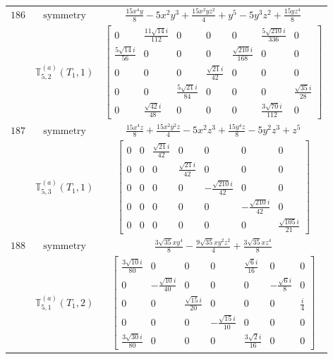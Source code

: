 \documentclass[fleqn,8pt,landscape]{jsarticle}
\begin{document}
\begin{longtable}{ccc}
$ 186 $ & $ \text{symmetry} $ & $ \frac{15 x^{4} y}{8} - 5 x^{2} y^{3} + \frac{15 x^{2} y z^{2}}{4} + y^{5} - 5 y^{3} z^{2} + \frac{15 y z^{4}}{8} $ \\
$  $ & $ \mathbb{T}_{5,2}^{(a)}(T_{1},1) $ & $ \begin{bmatrix} 0 & \frac{11 \sqrt{14} i}{112} & 0 & 0 & 0 & \frac{5 \sqrt{210} i}{336} & 0 \\ \frac{5 \sqrt{14} i}{56} & 0 & 0 & 0 & \frac{\sqrt{210} i}{168} & 0 & 0 \\ 0 & 0 & 0 & \frac{\sqrt{21} i}{42} & 0 & 0 & 0 \\ 0 & 0 & \frac{5 \sqrt{21} i}{84} & 0 & 0 & 0 & \frac{\sqrt{35} i}{28} \\ 0 & \frac{\sqrt{42} i}{48} & 0 & 0 & 0 & \frac{3 \sqrt{70} i}{112} & 0 \end{bmatrix} $ \\ \hline
$ 187 $ & $ \text{symmetry} $ & $ \frac{15 x^{4} z}{8} + \frac{15 x^{2} y^{2} z}{4} - 5 x^{2} z^{3} + \frac{15 y^{4} z}{8} - 5 y^{2} z^{3} + z^{5} $ \\
$  $ & $ \mathbb{T}_{5,3}^{(a)}(T_{1},1) $ & $ \begin{bmatrix} 0 & 0 & \frac{\sqrt{21} i}{42} & 0 & 0 & 0 & 0 \\ 0 & 0 & 0 & \frac{\sqrt{21} i}{42} & 0 & 0 & 0 \\ 0 & 0 & 0 & 0 & - \frac{\sqrt{210} i}{42} & 0 & 0 \\ 0 & 0 & 0 & 0 & 0 & - \frac{\sqrt{210} i}{42} & 0 \\ 0 & 0 & 0 & 0 & 0 & 0 & \frac{\sqrt{105} i}{21} \end{bmatrix} $ \\ \hline
$ 188 $ & $ \text{symmetry} $ & $ \frac{3 \sqrt{35} x y^{4}}{8} - \frac{9 \sqrt{35} x y^{2} z^{2}}{4} + \frac{3 \sqrt{35} x z^{4}}{8} $ \\
$  $ & $ \mathbb{T}_{5,1}^{(a)}(T_{1},2) $ & $ \begin{bmatrix} \frac{3 \sqrt{10} i}{80} & 0 & 0 & 0 & \frac{\sqrt{6} i}{16} & 0 & 0 \\ 0 & - \frac{\sqrt{10} i}{40} & 0 & 0 & 0 & - \frac{\sqrt{6} i}{8} & 0 \\ 0 & 0 & \frac{\sqrt{15} i}{20} & 0 & 0 & 0 & \frac{i}{4} \\ 0 & 0 & 0 & - \frac{\sqrt{15} i}{10} & 0 & 0 & 0 \\ \frac{3 \sqrt{30} i}{80} & 0 & 0 & 0 & \frac{3 \sqrt{2} i}{16} & 0 & 0 \end{bmatrix} $ \\ \hline

\end{longtable}
\end{document}
